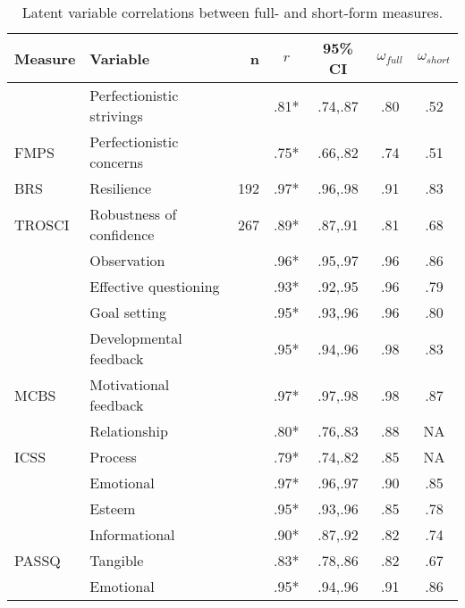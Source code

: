 \documentclass[
  12pt,
  a4paper,
]{book}
\begin{document}
\begin{table}

\caption{\label{tab:short-measure-correlations}Latent variable correlations between full- and short-form measures.}
\centering
\begin{tabular}[t]{llrcccc}
\toprule
Measure & Variable & n & $r$ & 95\% CI & $\omega_{full}$ & $\omega_{short}$\\
\midrule
 & Perfectionistic strivings &  & .81* & .74,.87 & .80 & .52\\
\cmidrule{2-2}
\cmidrule{4-7}
\multirow[t]{-2}{*}{\raggedright\arraybackslash FMPS} & Perfectionistic concerns & \multirow[t]{-2}{*}{\raggedleft\arraybackslash 120} & .75* & .66,.82 & .74 & .51\\
\cmidrule{1-7}
BRS & Resilience & 192 & .97* & .96,.98 & .91 & .83\\
\cmidrule{1-7}
TROSCI & Robustness of confidence & 267 & .89* & .87,.91 & .81 & .68\\
\cmidrule{1-7}
 & Observation &  & .96* & .95,.97 & .96 & .86\\
\cmidrule{2-2}
\cmidrule{4-7}
 & Effective questioning &  & .93* & .92,.95 & .96 & .79\\
\cmidrule{2-2}
\cmidrule{4-7}
 & Goal setting &  & .95* & .93,.96 & .96 & .80\\
\cmidrule{2-2}
\cmidrule{4-7}
 & Developmental feedback &  & .95* & .94,.96 & .98 & .83\\
\cmidrule{2-2}
\cmidrule{4-7}
\multirow[t]{-5}{*}{\raggedright\arraybackslash MCBS} & Motivational feedback & \multirow[t]{-5}{*}{\raggedleft\arraybackslash 263} & .97* & .97,.98 & .98 & .87\\
\cmidrule{1-7}
 & Relationship &  & .80* & .76,.83 & .88 & NA\\
\cmidrule{2-2}
\cmidrule{4-7}
\multirow[t]{-2}{*}{\raggedright\arraybackslash ICSS} & Process & \multirow[t]{-2}{*}{\raggedleft\arraybackslash 384} & .79* & .74,.82 & .85 & NA\\
\cmidrule{1-7}
 & Emotional &  & .97* & .96,.97 & .90 & .85\\
\cmidrule{2-2}
\cmidrule{4-7}
 & Esteem &  & .95* & .93,.96 & .85 & .78\\
\cmidrule{2-2}
\cmidrule{4-7}
 & Informational &  & .90* & .87,.92 & .82 & .74\\
\cmidrule{2-2}
\cmidrule{4-7}
\multirow[t]{-4}{*}{\raggedright\arraybackslash PASSQ} & Tangible &  & .83* & .78,.86 & .82 & .67\\
\cmidrule{1-2}
\cmidrule{4-7}
 & Emotional &  & .95* & .94,.96 & .91 & .86\\

\end{tabular}
\end{table}
\end{document}
